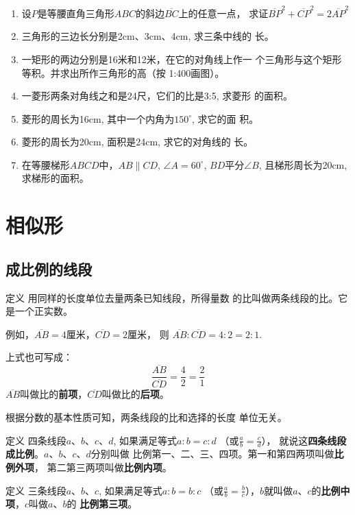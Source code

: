 \begin{enumerate}
\item 设$P$是等腰直角三角形$ABC$的斜边$\overline{BC}$上的任意一点，
求证$\overline{BP}^2+\overline{CP}^2=2\overline{AP}^2$
\item 三角形的三边长分别是2cm、3cm、4cm, 求三条中线的
长。
\item 一矩形的两边分别是16米和12米，在它的对角线上作一
个三角形与这个矩形等积。并求出所作三角形的高（按
1:400画图）。
\item 一菱形两条对角线之和是24尺，它们的比是3:5, 求菱形
的面积。
\item 菱形的周长为16cm, 其中一个内角为$150^{\circ}$, 求它的面
积。
\item 菱形的周长为20cm, 面积是24cm, 求它的对角线的
长。
\item 在等腰梯形$ABCD$中，$AB\parallel CD$, $\angle A=60^{\circ}$, $BD$平分$\angle B$, 且梯形周长为20cm, 求梯形的面积。
\end{enumerate}

\section{相似形}
\subsection{成比例的线段}

\begin{blk}
  {定义} 用同样的长度单位去量两条已知线段，所得量数
的比叫做两条线段的比。它是一个正实数。  
\end{blk}

例如，$\overline{AB}=4$厘米，$\overline{CD}=2$厘米，
则 $\overline{AB}:\overline{CD}=4:2=2:1$.

上式也可写成：
\[\frac{\overline{AB}}{\overline{CD}}=\frac{4}{2}=\frac{2}{1}\]
$\overline{AB}$叫做比的\textbf{前项}，$\overline{CD}$叫做比的\textbf{后项}。

根据分数的基本性质可知，两条线段的比和选择的长度
单位无关。


\begin{blk}
    {定义}
四条线段$a$、$b$、$c$、$d$, 如果满足等式$a:b=c:d$
（或$\frac{a}{b}=\frac{c}{d}$），
就说这\textbf{四条线段成比例}。$a$、$b$、$c$、$d$分别叫做
比例第一、二、三、四项。第一和第四两项叫做\textbf{比例外项}，
第二第三两项叫做\textbf{比例内项}。
\end{blk}

\begin{blk}
    {定义}
三条线段$a$、$b$、$c$, 如果满足等式$a:b=b:c$
（或$\frac{a}{b}=\frac{b}{c}$），$b$就叫做$a$、$c$的\textbf{比例中项}，$c$叫做$a$、$b$的
\textbf{比例第三项}。
\end{blk}

